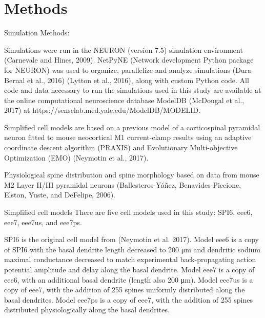 \section{Methods}

Simulation Methods:

Simulations were run in the NEURON (version 7.5) simulation environment (Carnevale and Hines, 2009).  NetPyNE (Network development Python package for NEURON) was used to organize, parallelize and analyze simulations (Dura-Bernal et al., 2016) (Lytton et al., 2016), along with custom Python code.  All code and data necessary to run the simulations used in this study are available at the online computational neuroscience database ModelDB (McDougal et al., 2017) at https://senselab.med.yale.edu/ModelDB/MODELID.

Simplified cell models are based on a previous model of a corticospinal pyramidal neuron fitted to mouse neocortical M1 current-clamp results using an adaptive coordinate descent algorithm (PRAXIS) and Evolutionary Multi-objective Optimization (EMO)  (Neymotin et al., 2017).

Physiological spine distribution and spine morphology based on data from mouse M2 Layer II/III pyramidal neurons (Ballesteros-Yáñez, Benavides-Piccione, Elston, Yuste, and DeFelipe, 2006).  

Simplified cell models
There are five cell models used in this study: SPI6, eee6, eee7, eee7us, and eee7ps.  

SPI6 is the original cell model from (Neymotin et al. 2017).  Model eee6 is a copy of SPI6 with the basal dendrite length decreased to 200 μm and dendritic sodium maximal conductance decreased to match experimental back-propagating action potential amplitude and delay along the basal dendrite.  Model eee7 is a copy of eee6, with an additional basal dendrite (length also 200 μm).  Model eee7us is a copy of eee7, with the addition of 255 spines uniformly distributed along the basal dendrites.  Model eee7ps is a copy of eee7, with the addition of 255 spines distributed physiologically along the basal dendrites.

